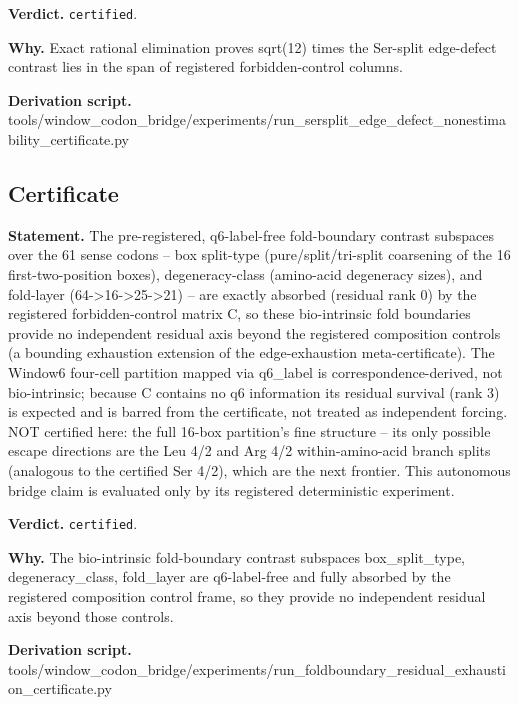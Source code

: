 \textbf{Verdict.} \texttt{certified}.

\textbf{Why.} Exact rational elimination proves sqrt(12) times the Ser-split edge-defect contrast lies in the span
of registered forbidden-control columns.

\textbf{Derivation script.} tools/window\_codon\_bridge/experiments/run\_sersplit\_edge\_defect\_nonestimability\_certificate.py

\subsection{Certificate}\label{sec:bridge-certificate}
\textbf{Statement.} The pre-registered, q6-label-free fold-boundary contrast subspaces over the 61 sense codons -- box
split-type (pure/split/tri-split coarsening of the 16 first-two-position boxes), degeneracy-class
(amino-acid degeneracy sizes), and fold-layer (64->16->25->21) -- are exactly absorbed (residual
rank 0) by the registered forbidden-control matrix C, so these bio-intrinsic fold boundaries provide
no independent residual axis beyond the registered composition controls (a bounding exhaustion
extension of the edge-exhaustion meta-certificate). The Window6 four-cell partition mapped via
q6\_label is correspondence-derived, not bio-intrinsic; because C contains no q6 information its
residual survival (rank 3) is expected and is barred from the certificate, not treated as
independent forcing. NOT certified here: the full 16-box partition's fine structure -- its only
possible escape directions are the Leu 4/2 and Arg 4/2 within-amino-acid branch splits (analogous to
the certified Ser 4/2), which are the next frontier. This autonomous bridge claim is evaluated only
by its registered deterministic experiment.

\textbf{Verdict.} \texttt{certified}.

\textbf{Why.} The bio-intrinsic fold-boundary contrast subspaces box\_split\_type, degeneracy\_class, fold\_layer
are q6-label-free and fully absorbed by the registered composition control frame, so they provide no
independent residual axis beyond those controls.

\textbf{Derivation script.} tools/window\_codon\_bridge/experiments/run\_foldboundary\_residual\_exhaustion\_certificate.py

